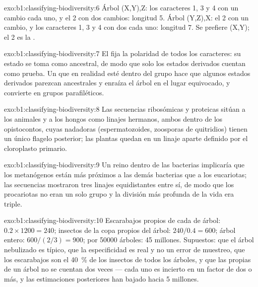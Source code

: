 \begin{solution}{exo:b1:classifying-biodiversity:6}
Árbol (X,Y),Z: los caracteres 1, 3 y 4 con un cambio cada uno, y el 
2 con dos cambios: longitud 5. Árbol (Y,Z),X: el  2 con un cambio, y
los caracteres 1, 3 y 4 con dos cada uno: longitud 7. Se prefiere (X,Y); el
 2 es la .
\end{solution}

\begin{solution}{exo:b1:classifying-biodiversity:7}
El  fija la polaridad de todos los caracteres: su estado se
toma como ancestral, de modo que solo los estados derivados cuentan como
prueba. Un  que en realidad esté dentro del grupo hace que
algunos estados derivados parezcan ancestrales y enraíza el árbol en el
lugar equivocado, y convierte  en grupos parafiléticos.
\end{solution}

\begin{solution}{exo:b1:classifying-biodiversity:8}
Las secuencias ribosómicas y proteicas sitúan a los animales y a los hongos
como linajes hermanos, ambos dentro de los opistocontos, cuyas 
nadadoras (espermatozoides, zoosporas de quitridios) tienen un único flagelo
posterior; las plantas quedan en un linaje aparte definido por el
cloroplasto primario.
\end{solution}

\begin{solution}{exo:b1:classifying-biodiversity:9}
Un reino dentro de las bacterias implicaría que los metanógenos están más
próximos a las demás bacterias que a los eucariotas; las secuencias
mostraron tres linajes equidistantes entre sí, de modo que los procariotas
no eran un solo grupo y la división más profunda de la vida era triple.
\end{solution}

\begin{solution}{exo:b1:classifying-biodiversity:10}
Escarabajos propios de cada  de árbol: $0.2\times 1200 = 240$;
insectos de la copa propios del árbol: $240/0.4 = 600$; árbol entero:
$600/(2/3) = 900$; por \num{50000} árboles: \num{45} millones.
Supuestos: que el árbol nebulizado es típico, que la especificidad es real y
no un error de muestreo, que los escarabajos son el \qty{40}{\%} de los
insectos de todos los árboles, y que las  propias de un árbol no se
cuentan dos veces --- cada uno es incierto en un factor de dos o más, y las
estimaciones posteriores han bajado hacia \num{5} millones.
\end{solution}


